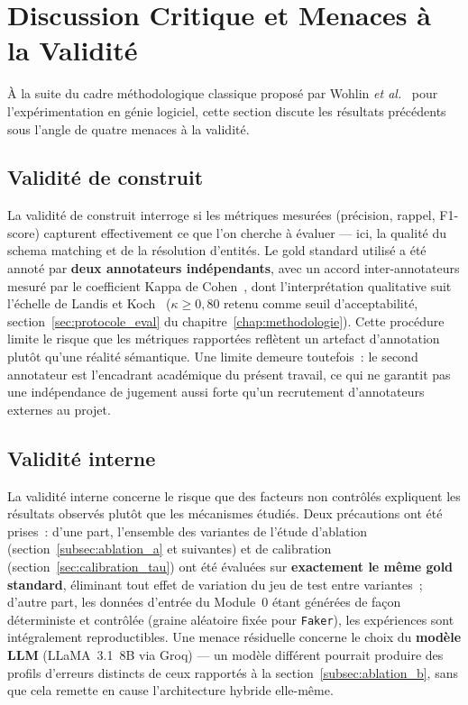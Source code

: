 \section{Discussion Critique et Menaces à la Validité}
\label{sec:discussion_critique}

À la suite du cadre méthodologique classique proposé par
Wohlin \textit{et al.}~\cite{wohlin2012experimentation} pour
l'expérimentation en génie logiciel, cette section discute les
résultats précédents sous l'angle de quatre menaces à la validité.

\subsection{Validité de construit}

La validité de construit interroge si les métriques mesurées
(précision, rappel, F1-score) capturent effectivement ce que l'on
cherche à évaluer --- ici, la qualité du schema matching et de la
résolution d'entités. Le gold standard utilisé a été annoté par
\textbf{deux annotateurs indépendants}, avec un accord inter-annotateurs
mesuré par le coefficient Kappa de Cohen~\cite{cohen1960kappa}, dont
l'interprétation qualitative suit l'échelle de
Landis et Koch~\cite{landis1977kappa} ($\kappa \geq 0{,}80$ retenu comme
seuil d'acceptabilité, section~\ref{sec:protocole_eval} du
chapitre~\ref{chap:methodologie}). Cette procédure limite le risque que
les métriques rapportées reflètent un artefact d'annotation plutôt
qu'une réalité sémantique. Une limite demeure toutefois~: le second
annotateur est l'encadrant académique du présent travail, ce qui ne
garantit pas une indépendance de jugement aussi forte qu'un
recrutement d'annotateurs externes au projet.

\subsection{Validité interne}

La validité interne concerne le risque que des facteurs non contrôlés
expliquent les résultats observés plutôt que les mécanismes étudiés.
Deux précautions ont été prises~: d'une part, l'ensemble des variantes
de l'étude d'ablation (section~\ref{subsec:ablation_a} et suivantes) et
de calibration (section~\ref{sec:calibration_tau}) ont été évaluées sur
\textbf{exactement le même gold standard}, éliminant tout effet de
variation du jeu de test entre variantes~; d'autre part, les données
d'entrée du Module~0 étant générées de façon déterministe et contrôlée
(graine aléatoire fixée pour \texttt{Faker}), les expériences sont
intégralement reproductibles. Une menace résiduelle concerne le choix
du \textbf{modèle LLM} (LLaMA~3.1~8B via Groq) --- un modèle différent
pourrait produire des profils d'erreurs distincts de ceux rapportés à la
section~\ref{subsec:ablation_b}, sans que cela remette en cause
l'architecture hybride elle-même.

